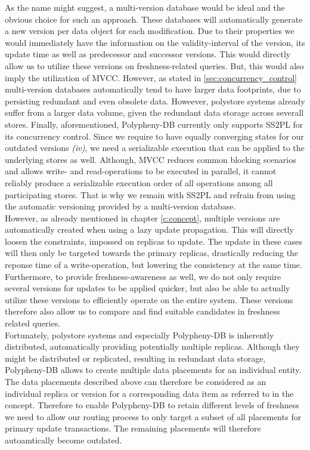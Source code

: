 As the name might suggest, a multi-version database would be ideal and the obvious choice for such an approach.
These databases will automatically generate a new version per data object for each modification. 
Due to their properties we would immediately have the information on the validity-interval of the version, its update time as well as predecessor and successor versions.
This would directly allow us to utilize these versions on freshness-related queries. But, this would also imply the utilization of MVCC.
However, as stated in \ref{sec:concurrency_control} multi-version databases automatically tend to have larger data footprints, due to persisting  
redundant and even obsolete data.
Howeever, polystore systems already suffer from a larger data volume, given the redundant data storage across severall stores.
Finally, aforementioned, Polypheny-DB currently only supports SS2PL for its concurrency control.
Since we require to have equally converging states for our outdated versions \textit{(iv)}, we need a serializable execution that can be applied to 
the underlying stores as well.
Although, MVCC reduces common blocking scenarios and allows write- and read-operations to be executed in parallel, 
it cannot reliably produce a serializable execution order of all operations among all participating stores.
That is why we remain with SS2PL and refrain from using the automatic versioning provided by a multi-version database.\\

However, as already mentioned in chapter \ref{c:concept}, multiple versions are automatically created when using a lazy update propagation. 
This will directly loosen the constraints, impossed on replicas to update. 
The update in these cases will then only be targeted towards the primary replicas, drastically reducing the reponse time of a write-operation,
but lowering the consistency at the same time.  
Furthermore, to provide freshness-awareness as well, we do not only require several versions for updates to be applied quicker,
but also be able to actually utilize these versions to efficiently operate on the entire system.
These versions therefore also allow us to compare and find suitable candidates in freshness related queries.\\

Fortunately, polystore systems and especially Polypheny-DB is inherently distributed, automatically providing potentially multiple replicas.
Although they might be distributed or replicated, resulting in redundant data storage, Polypheny-DB allows to create multiple data placements for an individual entity. 
The data placements described above can therefore be considered as an individual replica or version for a corresponding data item as referred to in the concept.
Therefore to enable Polypheny-DB to retain different levels of freshness we need to allow our routing process
to only target a subset of all placements for primary update transactions. The remaining placements will therefore autoamtically become outdated. 

